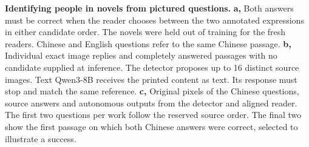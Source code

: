 \textbf{Identifying people in novels from pictured questions.}
\textbf{a,} Both answers must be correct when the reader chooses between the two annotated expressions in either candidate order. The novels were held out of training for the fresh readers. Chinese and English questions refer to the same Chinese passage. \textbf{b,} Individual exact image replies and completely answered passages with no candidate supplied at inference. The detector proposes up to 16 distinct source images. Text Qwen3-8B receives the printed content as text. Its response must stop and match the same reference. \textbf{c,} Original pixels of the Chinese questions, source answers and autonomous outputs from the detector and aligned reader. The first two questions per work follow the reserved source order. The final two show the first passage on which both Chinese answers were correct, selected to illustrate a success.
